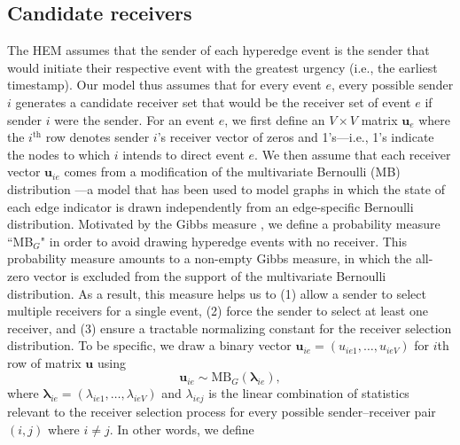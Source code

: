 \documentclass[ba]{imsart}
\numberwithin{equation}{section}
\theoremstyle{plain}
\begin{document}
	\subsection{Candidate receivers}\label{subsec: Tie}
	The HEM assumes that the sender of each hyperedge event is the sender that would initiate their respective event with the greatest urgency (i.e., the earliest timestamp). Our model thus assumes that for every event $e$, every possible sender $i$ generates a candidate receiver set that would be the receiver set of event $e$ if sender $i$ were the sender. For an event $e$, we first define an $V\times V$ matrix $\boldsymbol{u}_e$ where the $i^{\textrm{th}}$ row denotes sender $i$'s receiver vector of zeros and 1's---i.e., 1's indicate the nodes to which $i$ intends to direct event $e$. We then assume that each receiver vector $\boldsymbol{u}_{ie}$ comes from a modification of the multivariate Bernoulli (MB) distribution \citep{dai2013multivariate}---a model that has been used to model graphs in which the state of each edge indicator is drawn independently from an edge-specific Bernoulli distribution. Motivated by the Gibbs measure \citep{fellows2017removing}, we define a probability measure ``MB$_{G}$" in order to avoid drawing hyperedge events with no receiver. This probability measure amounts to a non-empty Gibbs measure, in which the all-zero vector is excluded from the support of the multivariate Bernoulli distribution. As a result, this measure helps us to (1) allow a sender to select multiple receivers for a single event, (2) force the sender to select at least one receiver, and (3) ensure a tractable normalizing constant for the receiver selection distribution. To be specific, we draw a binary vector $\boldsymbol{u}_{ie}= (u_{ie1},
	\ldots, u_{ieV})$ for $i$th row of matrix $\boldsymbol{u}$ using
	\begin{equation} \boldsymbol{u}_{ie}  \sim
		\mbox{MB}_{G}(\boldsymbol{\lambda}_{ie}),
	\end{equation}
	where $\boldsymbol{\lambda}_{ie}= (\lambda_{ie1},
	\ldots, \lambda_{ieV})$ and $\lambda_{iej}$ is the linear combination of statistics relevant to the receiver selection process for every possible sender--receiver pair $(i,j)$ where $i \!\neq\! j$. In other words, we define
\end{document}
